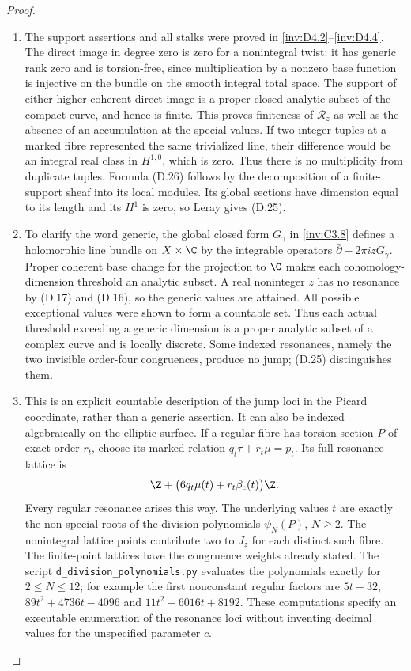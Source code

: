 \begin{proof}
\begin{enumerate}[label=\arabic*.,leftmargin=*]
\item The support assertions and all stalks were proved in \ref{inv:D4.2}--\ref{inv:D4.4}.
The direct image in degree zero is zero for a nonintegral twist:
it has generic rank zero and is torsion-free, since multiplication
by a nonzero base function is injective on the bundle on the smooth
integral total space. The support of either higher coherent direct
image is a proper closed analytic subset of the compact curve,
and hence is finite. This proves finiteness of $\mathcal R_z$ as
well as the absence of an accumulation at the special values.
If two integer tuples at a marked fibre represented the same
trivialized line, their difference would be an integral real class
in $H^{1,0}$, which is zero. Thus there is no multiplicity from
duplicate tuples. Formula (D.26) follows by the decomposition of a
finite-support sheaf into its local modules. Its global sections
have dimension equal to its length and its $H^1$ is zero, so Leray
gives (D.25).

\item To clarify the word generic, the global closed form $G_\gamma$ in
\ref{inv:C3.8} defines a holomorphic line bundle on $X\times\C$ by the
integrable operators $\bar\partial-2\pi i zG_\gamma$. Proper
coherent base change for the projection to $\C$ makes each
cohomology-dimension threshold an analytic subset. A real noninteger
$z$ has no resonance by (D.17) and (D.16), so the generic values are
attained. All possible exceptional values were shown to form a
countable set. Thus each actual threshold exceeding a generic
dimension is a proper analytic subset of a complex curve and is
locally discrete. Some indexed resonances, namely the two invisible
order-four congruences, produce no jump; (D.25) distinguishes them.

\item This is an explicit countable description of the jump loci in the
Picard coordinate, rather than a generic assertion. It can also be
indexed algebraically on the elliptic surface. If a regular fibre
has torsion section $P$ of exact order $r_t$, choose its marked
relation $q_t\tau+r_t\mu=p_t$. Its full resonance lattice is
\[
 \Z+\bigl(6q_t\mu(t)+r_t\beta_c(t)\bigr)\Z.
\]
Every regular resonance arises this way. The underlying values
$t$ are exactly the non-special roots of the division polynomials
$\psi_N(P)$, $N\ge2$. The nonintegral lattice points contribute two
to $J_z$ for each distinct such fibre. The finite-point lattices
have the congruence weights already stated. The script
\texttt{d\_division\_polynomials.py} evaluates the polynomials
exactly for $2\le N\le12$; for example the first nonconstant
regular factors are $5t-32$, $89t^2+4736t-4096$ and
$11t^2-6016t+8192$. These computations specify an executable
enumeration of the resonance loci without inventing decimal values
for the unspecified parameter $c$.


\end{enumerate}
\end{proof}
